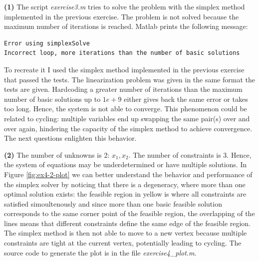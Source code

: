 \documentclass[unicode,11pt,a4paper,oneside,numbers=endperiod,openany]{scrartcl}
\begin{document}
\vspace{0.5cm}
\textbf{(1)}
The script \emph{exercise3.m} tries to solve the problem with the simplex method
implemented in the previous exercise.
The problem is not solved because the maximum number of iterations is reached.
Matlab prints the following message:

\begin{lstlisting}[language=bash, basicstyle=\ttfamily\color{red}\small]
Error using simplexSolve
Incorrect loop, more iterations than the number of basic solutions
\end{lstlisting}

To recreate it I used the simplex method implemented in the previous exercise that passed the tests.
The linearization problem was given in the same format the tests are given.
Hardcoding a greater number of iterations than the maximum number of basic solutions up to $1e+9$
either gives back the same error or takes too long. Hence, the system is not able to converge.
This phenomenon could be related to cycling: multiple variables end up swapping the same pair(s)
over and over again, hindering the capacity of the simplex method to achieve convergence.
The next questions enlighten this behavior.

\vspace{0.5cm}
\textbf{(2)}
The number of unknowns is 2: $x_1, x_2$.
The number of constraints is 3.
Hence, the system of equations may be underdetermined or have multiple solutions.
In Figure \ref{fig:ex4-2-plot} we can better understand the behavior and performance of the simplex solver
by noticing that there is a degeneracy, where more than one optimal solution exists:
the feasible region in yellow is where all constraints are satisfied simoultenously
and since more than one basic feasible solution corresponds to the same corner point of the feasible region,
the overlapping of the lines means that different constraints define the same edge of the feasible region.
The simplex method is then not able to move to a new vertex because multiple constraints are tight at the
current vertex, potentially leading to cycling.
The source code to generate the plot is in the file \textit{exercise4\_plot.m}.
\end{document}
